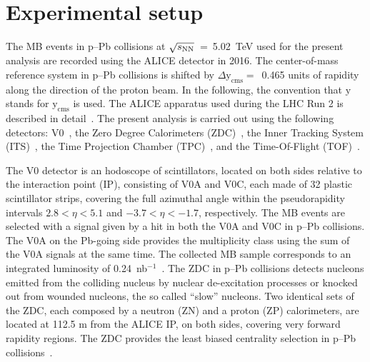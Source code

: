 \section{Experimental setup}
\label{sec:setup}
The MB events in p--Pb collisions at $\sqrt{s_{\rm NN}}$~=~5.02~TeV used for the present analysis are recorded using the ALICE detector in 2016. The center-of-mass reference system in p--Pb collisions is shifted by $\Delta \mathrm{y}_{\mathrm{cms}} =$~0.465 units of rapidity along the direction of the proton beam. In the following, the convention that $\mathrm{y}$ stands for $\mathrm{y}_{\mathrm{cms}}$ is used. The ALICE apparatus used during the LHC Run 2 is described in detail~\cite{Abelev:2014ffa}. The present analysis is carried out using the following detectors: V0~\cite{ALICE:2013axi}, the Zero Degree Calorimeters (ZDC)~\cite{Cortese:2019nnv}, the Inner Tracking System (ITS)~\cite{ALICE:2010tia}, the Time Projection Chamber (TPC)~\cite{Alme:2010ke}, and the Time-Of-Flight (TOF)~\cite{Jacazio:2018slq}. 

The V0 detector is an hodoscope of scintillators, located on both sides relative to the interaction point (IP), consisting of V0A and V0C, each made of 32 plastic scintillator strips, covering the full azimuthal angle within the pseudorapidity intervals $2.8 < \eta < 5.1$ and $-3.7 < \eta < -1.7$, respectively. The MB events are selected with a signal given by a hit in both the V0A and V0C in p--Pb collisions. The V0A on the Pb-going side provides the multiplicity class using the sum of the V0A signals at the same time. The collected MB sample corresponds to an integrated luminosity of 0.24~nb$^{-1}$~\cite{ALICE:2014gvw}. The ZDC in p--Pb collisions detects nucleons emitted from the colliding nucleus by nuclear de-excitation processes or knocked out from wounded nucleons, the so called “slow” nucleons. Two identical sets of the ZDC, each composed by a neutron (ZN) and a proton (ZP) calorimeters, are located at 112.5 m from the ALICE IP, on both sides, covering very forward rapidity regions. The ZDC provides the least biased centrality selection in p--Pb collisions~\cite{ALICE:2014xsp}.


